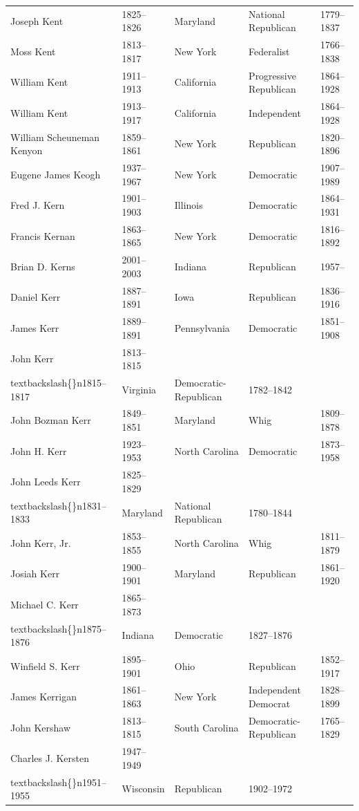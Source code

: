 \documentclass{article}
\begin{document}
\begin{tabular}{lllll}
Joseph Kent & 1825–1826 & Maryland & National Republican & 1779–1837 \\
Moss Kent & 1813–1817 & New York & Federalist & 1766–1838 \\
William Kent & 1911–1913 & California & Progressive Republican & 1864–1928 \\
William Kent & 1913–1917 & California & Independent & 1864–1928 \\
William Scheuneman Kenyon & 1859–1861 & New York & Republican & 1820–1896 \\
Eugene James Keogh & 1937–1967 & New York & Democratic & 1907–1989 \\
Fred J. Kern & 1901–1903 & Illinois & Democratic & 1864–1931 \\
Francis Kernan & 1863–1865 & New York & Democratic & 1816–1892 \\
Brian D. Kerns & 2001–2003 & Indiana & Republican & 1957– \\
Daniel Kerr & 1887–1891 & Iowa & Republican & 1836–1916 \\
James Kerr & 1889–1891 & Pennsylvania & Democratic & 1851–1908 \\
John Kerr & 1813–1815\\textbackslash\{\}n1815–1817 & Virginia & Democratic-Republican & 1782–1842 \\
John Bozman Kerr & 1849–1851 & Maryland & Whig & 1809–1878 \\
John H. Kerr & 1923–1953 & North Carolina & Democratic & 1873–1958 \\
John Leeds Kerr & 1825–1829\\textbackslash\{\}n1831–1833 & Maryland & National Republican & 1780–1844 \\
John Kerr, Jr. & 1853–1855 & North Carolina & Whig & 1811–1879 \\
Josiah Kerr & 1900–1901 & Maryland & Republican & 1861–1920 \\
Michael C. Kerr & 1865–1873\\textbackslash\{\}n1875–1876 & Indiana & Democratic & 1827–1876 \\
Winfield S. Kerr & 1895–1901 & Ohio & Republican & 1852–1917 \\
James Kerrigan & 1861–1863 & New York & Independent Democrat & 1828–1899 \\
John Kershaw & 1813–1815 & South Carolina & Democratic-Republican & 1765–1829 \\
Charles J. Kersten & 1947–1949\\textbackslash\{\}n1951–1955 & Wisconsin & Republican & 1902–1972 \\

\end{tabular}
\end{document}
